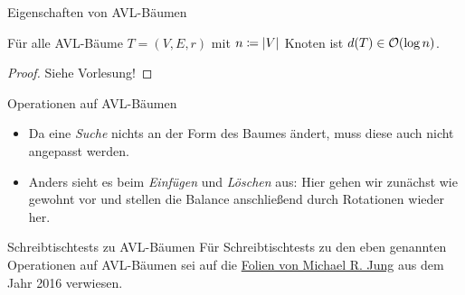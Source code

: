 \begin{frame}{Eigenschaften von AVL-B\"aumen}
\begin{theorem}
F\"ur alle AVL-B\"aume $T = (V, E, r)$ mit $n \coloneqq \vert V\vert$ Knoten ist $d(T) \in \mathcal{O}(\log n)$.
\end{theorem}
\begin{proof}
Siehe Vorlesung!
\end{proof}
\end{frame}

\begin{frame}{Operationen auf AVL-B\"aumen}

\begin{itemize}
    \item<+-> Da eine \emph{Suche} nichts an der Form des Baumes \"andert, muss diese auch nicht angepasst werden.
    \item<+-> Anders sieht es beim \emph{Einf\"ugen} und \emph{L\"oschen} aus: Hier gehen wir zun\"achst wie gewohnt vor und stellen die Balance anschlie{\ss}end durch \alert{Rotationen} wieder her.
\end{itemize}
\end{frame}

\begin{frame}{Schreibtischtests zu AVL-B\"aumen}
F\"ur Schreibtischtests zu den eben genannten Operationen auf AVL-B\"aumen sei auf die \alert{\href{https://www2.informatik.hu-berlin.de/~mjung/Tutorium/AlgoDat2016/folien10.pdf}{Folien von Michael R. Jung}} aus dem Jahr 2016 verwiesen.
\end{frame}
